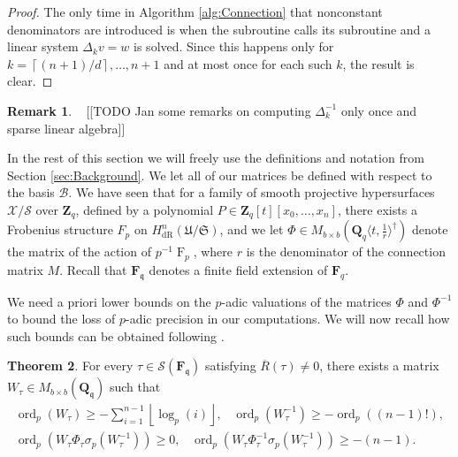 \documentclass[a4paper,11pt]{article}
\numberwithin{equation}{section}
\providecommand{\floor}[1]{\left\lfloor#1\right\rfloor}   %
\providecommand{\ceil}[1]{\left\lceil#1\right\rceil}   %
\newcommand{\ZZ}{\mathbf{Z}} %
\newcommand{\QQ}{\mathbf{Q}} %
\newcommand{\FF}{\mathbf{F}} %
\DeclareMathOperator{\ord}{ord}          %
\DeclareMathOperator{\Frob}{F}           %
\providecommand{\HdR}{H_{\text{dR}}}    %
\providecommand{\cB}{\mathcal{B}} %
\theoremstyle{definition}
\newtheorem{thm}{Theorem}[section]
\newtheorem{rem}[thm]{Remark}
\begin{document}
\begin{proof}
The only time in Algorithm \ref{alg:Connection} that nonconstant denominators are introduced is when the subroutine {} 
calls its subroutine {} and a linear system $\Delta_k v = w$ is solved. Since this happens only for 
$k=\ceil{(n+1)/d}, \dotsc, n+1$ and at most once for each such $k$, the result is clear.
\end{proof}

\begin{rem} \mbox{ }
[[TODO Jan some remarks on computing $\Delta_k^{-1}$ only once and sparse linear algebra]]
\end{rem}

In the rest of this section we will freely use the definitions and notation from Section \ref{sec:Background}. 
We let all of our matrices be defined with respect to the basis $\cB$. We have seen that for a
family of smooth projective hypersurfaces $\mathcal{X}/\mathcal{S}$ over $\ZZ_q$, 
defined by a polynomial $P \in \ZZ_q[t][x_0,\ldots,x_n]$, there exists 
a Frobenius structure $F_p$ on $\HdR^n(\mathfrak{U}/\mathfrak{S})$, and we let 
$\Phi \in M_{b \times b}(\QQ_q \langle t, \frac{1}{r} \rangle^{\dag})$ denote the 
matrix of the action of $p^{-1}\Frob_p$, where $r$ is the denominator of the connection 
matrix $M$. Recall that $\FF_{\mathfrak{q}}$ denotes a finite field extension of $\FF_q$. 

We need a priori lower bounds on the $p$-adic valuations of the matrices $\Phi$ and 
$\Phi^{-1}$ to bound the loss of $p$-adic precision in our computations. We will now
recall how such bounds can be obtained following \cite{AbbottKedlayaRoe2006}.

\begin{thm} \label{thm:deltabound}
For every 
$\tau \in \mathcal{S}(\FF_{\mathfrak{q}})$ satisfying $\overline{R}(\tau) \neq 0$, there exists a 
matrix $W_{\tau} \in M_{b \times b}(\QQ_{\mathfrak{q}})$ such that 
\begin{align*}
\ord_p(W_{\tau}) \geq -\sum_{i=1}^{n-1} \floor{\log_p(i)}, \; \; \; 
\ord_p(W_{\tau}^{-1}) \geq -\ord_p((n-1)!), \\
\ord_p(W_{\tau} \Phi_{\tau} \sigma_p(W_{\tau}^{-1})) \geq 0, \; \; \; 
\ord_p(W_{\tau} \Phi_{\tau}^{-1} \sigma_p(W_{\tau}^{-1})) \geq -(n-1).
\end{align*}
\end{thm}
\end{document}
